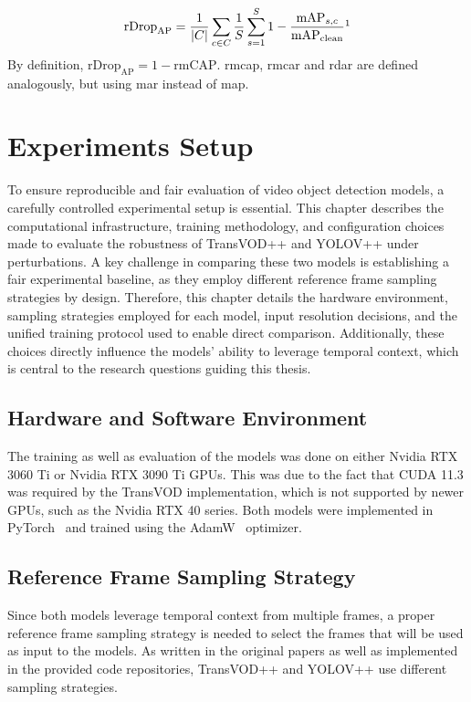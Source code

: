 \documentclass[final,twoside]{vutinfth}
\begin{document}
\begin{equation}
\mathrm{rDrop}_{\mathrm{AP}}
=
\frac{1}{|C|}
\sum_{c \in C}
\frac{1}{S}
\sum_{s=1}^{S}
1 - \frac{\mathrm{mAP}_{s,c}}{\mathrm{mAP}_{\mathrm{clean}}}
\footnotemark[1]
\end{equation}
By definition, $\mathrm{rDrop}_{\mathrm{AP}} = 1 - \mathrm{rmCAP}$.
\gls{rmcap}, \gls{rmcar} and \gls{rdar} are defined analogously, but using \gls{mar} instead of \gls{map}.



\chapter{Experiments Setup}
To ensure reproducible and fair evaluation of video object detection models, a carefully controlled experimental setup is essential.
This chapter describes the computational infrastructure, training methodology, and configuration choices made to evaluate the robustness of TransVOD++ and YOLOV++ under perturbations.
A key challenge in comparing these two models is establishing a fair experimental baseline, as they employ different reference frame sampling strategies by design.
Therefore, this chapter details the hardware environment, sampling strategies employed for each model, input resolution decisions, and the unified training protocol used to enable direct comparison.
Additionally, these choices directly influence the models' ability to leverage temporal context, which is central to the research questions guiding this thesis.

\section{Hardware and Software Environment}
The training as well as evaluation of the models was done on either Nvidia RTX 3060 Ti or Nvidia RTX 3090 Ti GPUs.
This was due to the fact that CUDA 11.3 was required by the TransVOD implementation, which is not supported by newer GPUs, such as the Nvidia RTX 40 series.
Both models were implemented in PyTorch~\cite{paszke2019pytorch} and trained using the AdamW~\cite{loshchilov2019decoupled} optimizer.

\section{Reference Frame Sampling Strategy} 
Since both models leverage temporal context from multiple frames, a proper reference frame sampling strategy is needed to select the frames that will be used as input to the models.
As written in the original papers as well as implemented in the provided code repositories, TransVOD++ and YOLOV++ use different sampling strategies.
\end{document}
